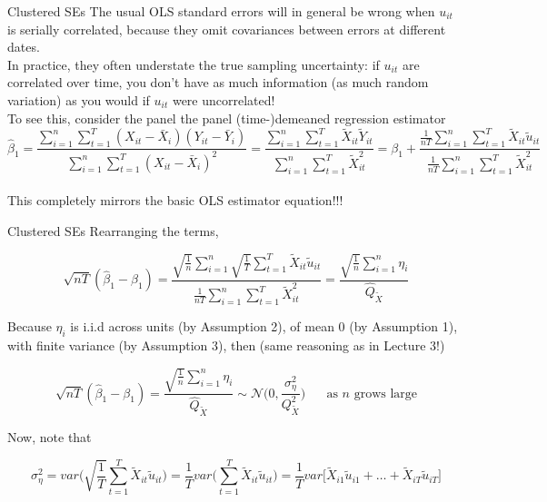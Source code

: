\documentclass[notes,10pt, aspectratio=169]{beamer}
\begin{document}
\begin{frame}{Clustered SEs}
The usual OLS standard errors will in general be wrong when $u_{it}$ is serially correlated, because they omit covariances between errors at different dates.\\[1em]

In practice, they often understate the true sampling uncertainty: if $u_{it}$ are correlated over time, you don’t have as much information (as much random variation) as you would if $u_{it}$ were uncorrelated!\\[1em]

To see this, consider the panel the panel (time-)demeaned regression estimator
\begin{equation*}
    \hat{\beta}_1 = \frac{\sum_{i=1}^n\sum_{t=1}^T (X_{it}-\bar{X}_i)(Y_{it}-\bar{Y}_i)}{\sum_{i=1}^n\sum_{t=1}^T (X_{it}-\bar{X}_i)^2} = \frac{\sum_{i=1}^n\sum_{t=1}^T \tilde{X}_{it} \tilde{Y}_{it}}{\sum_{i=1}^n\sum_{t=1}^T  \tilde{X}_{it}^2} = \beta_1 +  \frac{\frac{1}{nT}\sum_{i=1}^n\sum_{t=1}^T \tilde{X}_{it} \tilde{u}_{it}}{\frac{1}{nT} \sum_{i=1}^n\sum_{t=1}^T  \tilde{X}_{it}^2}
\end{equation*}\\[1em]
This completely mirrors the basic OLS estimator equation!!!
\end{frame}

\begin{frame}{Clustered SEs}
Rearranging the terms,

    \begin{equation*}
        \sqrt{nT}(\hat{\beta}_1 - \beta_1)  = \frac{\sqrt{\frac{1}{n}}\sum_{i=1}^n \sqrt{\frac{1}{T}} \sum_{t=1}^T 
 \tilde{X}_{it} \tilde{u}_{it} }{\frac{1}{nT} \sum_{i=1}^n\sum_{t=1}^T  \tilde{X}_{it}^2}  = \frac{\sqrt{\frac{1}{n}}\sum_{i=1}^n \eta_i }{\hat{Q}_{\tilde{X}}}
    \end{equation*}

Because $\eta_i$ is i.i.d across units (by Assumption 2), of mean 0 (by Assumption 1), with finite variance (by Assumption 3), then (same reasoning as in Lecture 3!)

    \begin{equation*}
  \sqrt{nT}(\hat{\beta}_1 - \beta_1)  = \frac{\sqrt{\frac{1}{n}}\sum_{i=1}^n \eta_i }{\hat{Q}_{\tilde{X}}} \sim \mathcal{N}\Big(0, \frac{\sigma_\eta^2}{{Q}_{\tilde{X}}^2} \Big) \text{~~~~ as $n$ grows large}
    \end{equation*}

Now, note that

\begin{equation*}
    \sigma_\eta^2 = var\Bigg(\sqrt{\frac{1}{T}} \sum_{t=1}^T 
 \tilde{X}_{it} \tilde{u}_{it}\Bigg) = \frac{1}{T} var\Big(\sum_{t=1}^T 
 \tilde{X}_{it} \tilde{u}_{it}\Big) = \frac{1}{T} var\Big[\tilde{X}_{i1} \tilde{u}_{i1}+\dots+ \tilde{X}_{iT} \tilde{u}_{iT}\Big]
\end{equation*}
\end{frame}
\end{document}

